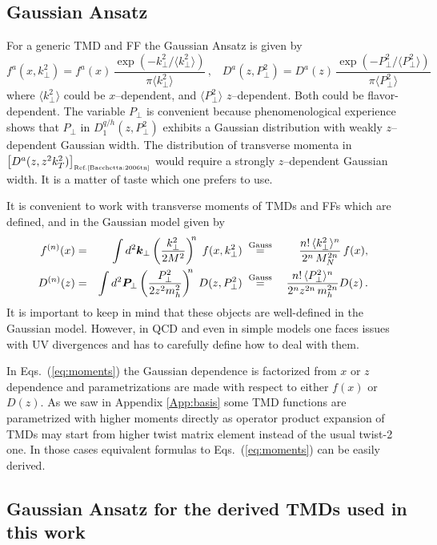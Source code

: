 \documentclass[a4paper,11pt]{article}
\newcommand{\be}{\begin{equation}}
\newcommand{\ee}{\end{equation}}
\newcommand{\la}{\langle}
\newcommand{\ra}{\rangle}
\def\bfkperp{{\bm k}_\perp}
\def\bfpperp{{\bm P}_\perp}
\def\kperp{k_\perp}
\def\pperp{P_\perp}
\begin{document}
\subsection{Gaussian Ansatz}

For a generic TMD and FF the Gaussian Ansatz is given by
\be
    f^a(x,\kperp^2)=
    f^a(x)\,\frac{\exp(-\kperp^2/\la\kperp^2\ra)}{\pi\la\kperp^2\ra}\,,\;\;\;
    D^a(z,\pperp^2)=
    D^a(z)\,\frac{\exp(-\pperp^2/\la\pperp^2\ra)}{\pi\la\pperp^2\ra}
\ee
where
$\la\kperp^2\ra$ could be $x$--dependent,
and $\la\pperp^2\ra$ $z$--dependent.
Both could be flavor-dependent.
The variable $\pperp$ is convenient because phenomenological experience
shows that $\pperp$ in $D_1^{q/h}(z,\pperp^2)$ exhibits a Gaussian distribution
with weakly $z$--dependent Gaussian width. The distribution of transverse
momenta in $\left[D^a(z,z^2 k_T^2)\right]_{\mbox{\tiny Ref.\cite{Bacchetta:2006tn}}}$
would require a strongly $z$--dependent Gaussian width. It is a matter of
taste which one prefers to use.

It is convenient to work with transverse moments of TMDs and FFs
which are defined, and in the Gaussian model given by
\begin{alignat}{6}
	f^{(n)}(x) &=& \int d^2\bfkperp
	\left(\frac{\kperp^2}{2M^2}\right)^{\!\!n}\; f(x, \kperp^2)
	\;&\stackrel{\rm Gauss}{=}&\;
	\frac{n!\,\la \kperp^2\ra^n}{ 2^n\,M_N^{2n}}\, f(x),\;\;\;\nonumber\\
	D^{(n)}(z) &=& \int d^2\bfpperp
	\left(\frac{\pperp^2}{2 z^2 m_h^2}\right)^{\!\!n}\; D(z, \pperp^2)
	\;&\stackrel{\rm Gauss}{=}&\;
	\frac{n!\,\la \pperp^2\ra^n}{ 2^n_{ }z^{2n}_{ }\,m_{h}^{2n}} D(z)\,. \;\;\;
	\label{eq:moments}
\end{alignat}
It is important to keep in mind that these objects are well-defined
in the Gaussian model. However, in QCD and even in simple models
\cite{Avakian:2010br,Schweitzer:2012hh} one faces issues with UV
divergences and has to carefully define how to deal with them.

In Eqs.~(\ref{eq:moments}) the Gaussian dependence is factorized
from $x$ or $z$ dependence and parametrizations are made with
respect to either $f(x)$ or $D(z)$. As we saw in Appendix
\ref{App:basis} some TMD functions are parametrized with higher
moments directly as operator product expansion of TMDs may start
from higher twist matrix element instead of the usual twist-2 one.
In those cases equivalent formulas to Eqs.~(\ref{eq:moments}) can
be easily derived.

\subsection{Gaussian Ansatz for the derived TMDs used in this work}
\label{App-B:Gauss-Ansatz-non-basis-TMDs}
\end{document}
